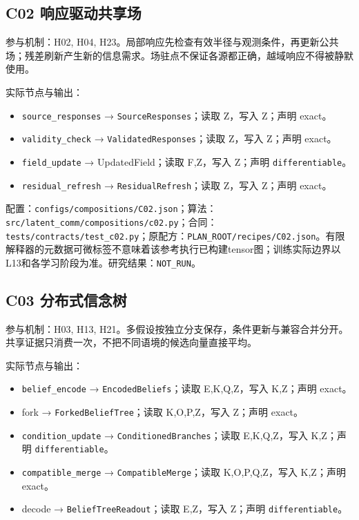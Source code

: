 \documentclass[
  10pt,
]{article}
\begin{document}
\subsection{C02
响应驱动共享场}\label{c02-ux54cdux5e94ux9a71ux52a8ux5171ux4eabux573a}

参与机制：H02, H04,
H23。局部响应先检查有效半径与观测条件，再更新公共场；残差刷新产生新的信息需求。场驻点不保证各源都正确，越域响应不得被静默使用。

实际节点与输出：

\begin{itemize}
\item
  \nolinkurl{source_responses} → \nolinkurl{SourceResponses}；读取
  Z，写入 Z；声明 exact。
\item
  \nolinkurl{validity_check} → \nolinkurl{ValidatedResponses}；读取
  Z，写入 Z；声明 exact。
\item
  \nolinkurl{field_update} → UpdatedField；读取 F,Z，写入 Z；声明
  \nolinkurl{differentiable}。
\item
  \nolinkurl{residual_refresh} → \nolinkurl{ResidualRefresh}；读取
  Z，写入 Z；声明 exact。
\end{itemize}

配置：{\small\nolinkurl{configs/compositions/C02.json}}；算法：{\small\nolinkurl{src/latent_comm/compositions/c02.py}}；合同：{\small\nolinkurl{tests/contracts/test_c02.py}}；原配方：{\small\nolinkurl{PLAN_ROOT/recipes/C02.json}}。有限解释器的元数据可微标签不意味着该参考执行已构建tensor图；训练实际边界以L13和各学习阶段为准。研究结果：\nolinkurl{NOT_RUN}。

\subsection{C03
分布式信念树}\label{c03-ux5206ux5e03ux5f0fux4fe1ux5ff5ux6811}

参与机制：H03, H13,
H21。多假设按独立分支保存，条件更新与兼容合并分开。共享证据只消费一次，不把不同语境的候选向量直接平均。

实际节点与输出：

\begin{itemize}
\item
  \nolinkurl{belief_encode} → \nolinkurl{EncodedBeliefs}；读取
  E,K,Q,Z，写入 K,Z；声明 exact。
\item
  fork → \nolinkurl{ForkedBeliefTree}；读取 K,O,P,Z，写入 Z；声明
  exact。
\item
  \nolinkurl{condition_update} → \nolinkurl{ConditionedBranches}；读取
  E,K,Q,Z，写入 K,Z；声明 \nolinkurl{differentiable}。
\item
  \nolinkurl{compatible_merge} → \nolinkurl{CompatibleMerge}；读取
  K,O,P,Q,Z，写入 K,Z；声明 exact。
\item
  decode → \nolinkurl{BeliefTreeReadout}；读取 E,Z，写入 Z；声明
  \nolinkurl{differentiable}。
\end{itemize}
\end{document}
